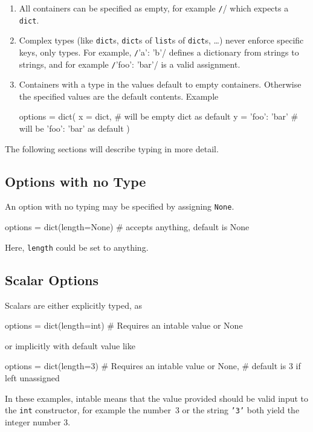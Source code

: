 \begin{enumerate}
\item All containers can be specified as empty, for example
  \texttt/{}/ which expects a \texttt{dict}.

\item Complex types (like \texttt{dict}s, \texttt{dict}s of
  \texttt{list}s of \texttt{dict}s, \dots) never enforce specific
  keys, only types.  For example, \texttt/{'a': 'b'}/
  defines a dictionary from strings to strings, and for example
  \texttt/{'foo': 'bar'}/ is a valid
  assignment.

\item Containers with a type in the values default to empty containers.
  Otherwise the specified values are the default contents.  Example
  \begin{python}
options = dict(
    x = dict,           # will be empty dict as default
    y = {'foo': 'bar'}  # will be {'foo': 'bar'} as default
)
  \end{python}
\end{enumerate}

The following sections will describe typing in more detail.



\subsection{Options with no Type}
An option with no typing may be specified by assigning \texttt{None}.
\begin{python}
options = dict(length=None)  # accepts anything, default is None
\end{python}
Here, \texttt{length} could be set to anything.



\subsection{Scalar Options}
Scalars are either explicitly typed, as
\begin{python}
options = dict(length=int)   # Requires an intable value or None
\end{python}
or implicitly with default value like
\begin{python}
options = dict(length=3)     # Requires an intable value or None,
                             # default is 3 if left unassigned
\end{python}
In these examples, intable means that the value provided should be
valid input to the \texttt{int} constructor, for example the number~3
or the string \texttt{'3'} both yield the integer number 3.



